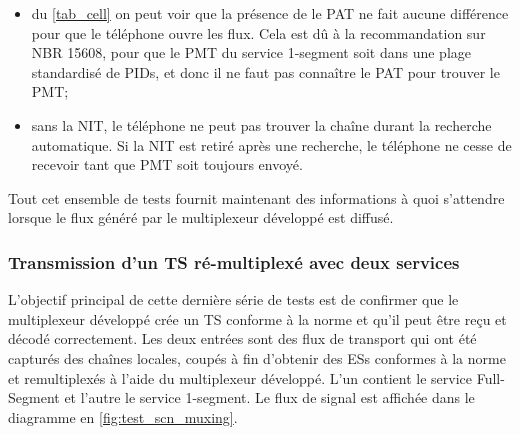 \documentclass[12pt,a4paper]{article}
\begin{document}

\begin{itemize}
\item du \autoref{tab_cell} on peut voir que la présence de le PAT ne fait aucune différence pour que le téléphone ouvre les flux. Cela est dû à la recommandation sur NBR 15608, pour que le PMT du service 1-segment soit dans une plage standardisé de PIDs, et donc il ne faut pas connaître le PAT pour trouver le PMT;
\item sans la NIT, le téléphone ne peut pas trouver la chaîne durant la recherche automatique. Si la NIT est retiré après une recherche, le téléphone ne cesse de recevoir tant que PMT soit toujours envoyé.
\end{itemize}


Tout cet ensemble de tests fournit maintenant des informations à quoi s'attendre lorsque le flux généré par le multiplexeur développé est diffusé.

\subsubsection{Transmission d'un TS ré-multiplexé avec deux services}
\label{test_remultiplexing}

L'objectif principal de cette dernière série de tests est de confirmer que le multiplexeur développé crée un TS conforme à la norme et qu'il peut être reçu et décodé correctement. Les deux entrées sont des flux de transport qui ont été capturés des chaînes locales, coupés à fin d'obtenir des ESs conformes à la norme et remultiplexés à l'aide du multiplexeur développé. L'un contient le service Full-Segment et l'autre le service 1-segment. Le flux de signal est affichée dans le diagramme en \autoref{fig:test_scn_muxing}.
\end{document}
